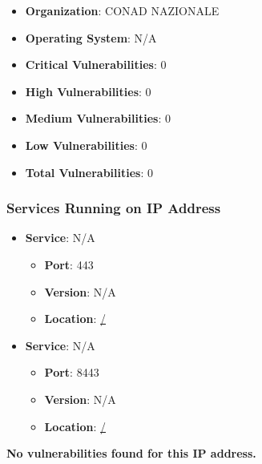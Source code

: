 \documentclass{article}
\begin{document}
\begin{itemize}
    \item \textbf{Organization}: CONAD NAZIONALE
    \item \textbf{Operating System}:  N/A 
    \item \textbf{Critical Vulnerabilities}: 0
    \item \textbf{High Vulnerabilities}: 0
    \item \textbf{Medium Vulnerabilities}: 0
    \item \textbf{Low Vulnerabilities}: 0
    \item \textbf{Total Vulnerabilities}: 0
\end{itemize}

\subsubsection*{Services Running on IP Address}

\begin{itemize}
    
        \item \textbf{Service}: N/A
        \begin{itemize}
            \item \textbf{Port}: 443
            \item \textbf{Version}:  N/A 
            \item \textbf{Location}: \href{ / }{ / }
        \end{itemize}
    
        \item \textbf{Service}: N/A
        \begin{itemize}
            \item \textbf{Port}: 8443
            \item \textbf{Version}:  N/A 
            \item \textbf{Location}: \href{ / }{ / }
        \end{itemize}
    
\end{itemize}


\textbf{No vulnerabilities found for this IP address.}




\clearpage
\end{document}
